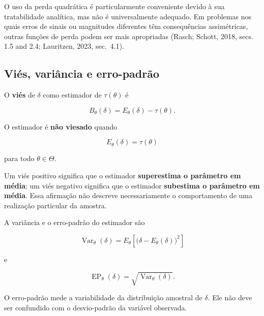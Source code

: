 \documentclass[
  letterpaper,
  DIV=11,
  numbers=noendperiod]{scrreprt}
\begin{document}
O uso da perda quadrática é particularmente conveniente devido à sua
tratabilidade analítica, mas não é universalmente adequado. Em problemas
nos quais erros de sinais ou magnitudes diferentes têm consequências
assimétricas, outras funções de perda podem ser mais apropriadas (Rasch;
Schott, 2018, secs. 1.5 and 2.4; Lauritzen, 2023, sec.~4.1).

\subsection*{Viés, variância e
erro-padrão}\label{viuxe9s-variuxe2ncia-e-erro-padruxe3o}

\begin{tcolorbox}[enhanced jigsaw, colback=white, leftrule=.75mm, colbacktitle=quarto-callout-important-color!10!white, breakable, titlerule=0mm, bottomtitle=1mm, title=\textcolor{quarto-callout-important-color}{\faExclamation}\hspace{0.5em}{Definição --- Viés}, colframe=quarto-callout-important-color-frame, toprule=.15mm, opacityback=0, bottomrule=.15mm, opacitybacktitle=0.6, arc=.35mm, toptitle=1mm, rightrule=.15mm, coltitle=black, left=2mm]

O \textbf{viés} de \(\delta\) como estimador de \(\tau(\theta)\) é

\[B_\theta(\delta)
=
E_\theta(\delta)-\tau(\theta).\]

O estimador é \textbf{não viesado} quando

\[E_\theta(\delta)=\tau(\theta)\]

para todo \(\theta\in\Theta\).

\end{tcolorbox}

Um viés positivo significa que o estimador \textbf{superestima o
parâmetro em média}; um viés negativo significa que o estimador
\textbf{subestima o parâmetro em média}. Essa afirmação não descreve
necessariamente o comportamento de uma realização particular da amostra.

A variância e o erro-padrão do estimador são

\[\operatorname{Var}_\theta(\delta)
=
E_\theta\left[\bigl(\delta-E_\theta(\delta)\bigr)^2\right]\]

e

\[\operatorname{EP}_\theta(\delta)
=
\sqrt{\operatorname{Var}_\theta(\delta)}.\]

O erro-padrão mede a variabilidade da distribuição amostral de
\(\delta\). Ele não deve ser confundido com o desvio-padrão da variável
observada.
\end{document}
